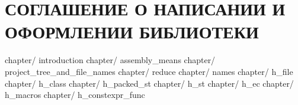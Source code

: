 \part{СОГЛАШЕНИЕ О НАПИСАНИИ И ОФОРМЛЕНИИ БИБЛИОТЕКИ}\label{logic:bib2}

	{chapter/}	{introduction}					%
	{chapter/}	{assembly_means}				%
	{chapter/}	{project_tree_and_file_names}	%
	{chapter/}	{reduce}						%
	{chapter/}	{names}							%
	{chapter/}	{h_file}						%
	{chapter/}	{h_class}						%
	{chapter/}	{h_packed_st}					%
	{chapter/}	{h_st}							%
	{chapter/}	{h_ec}							%
	{chapter/}	{h_macros}						%
	{chapter/}	{h_constexpr_func}				%